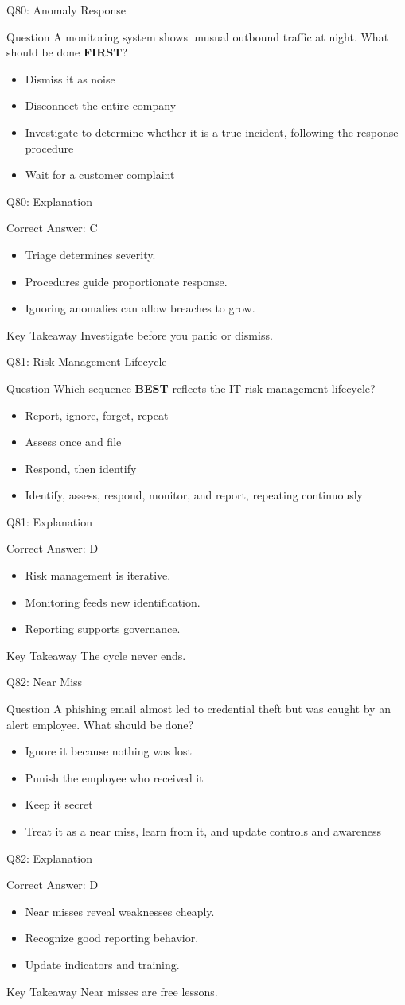\documentclass[aspectratio=169]{beamer}
\newcommand{\hq}[7]{%
	\begin{frame}{Q#1: #2}
		\begin{block}{Question}
			#3
		\end{block}
		\begin{itemize}
			#4
		\end{itemize}
	\end{frame}
	\begin{frame}{Q#1: Explanation}
		\begin{block}{Correct Answer: #5}
			\begin{itemize}
				#6
			\end{itemize}
		\end{block}
		\begin{alertblock}{Key Takeaway}
			#7
		\end{alertblock}
	\end{frame}
}
\begin{document}
	\hq{80}{Anomaly Response}
	{A monitoring system shows unusual outbound traffic at night. What should be done \textbf{FIRST}?}
	{\item[\textbf{(A)}] Dismiss it as noise
		\item[\textbf{(B)}] Disconnect the entire company
		\item[\textbf{(C)}] Investigate to determine whether it is a true incident, following the response procedure
		\item[\textbf{(D)}] Wait for a customer complaint}
	{C}
	{\item Triage determines severity.
		\item Procedures guide proportionate response.
		\item Ignoring anomalies can allow breaches to grow.}
	{Investigate before you panic or dismiss.}
	
	\hq{81}{Risk Management Lifecycle}
	{Which sequence \textbf{BEST} reflects the IT risk management lifecycle?}
	{\item[\textbf{(A)}] Report, ignore, forget, repeat
		\item[\textbf{(B)}] Assess once and file
		\item[\textbf{(C)}] Respond, then identify
		\item[\textbf{(D)}] Identify, assess, respond, monitor, and report, repeating continuously}
	{D}
	{\item Risk management is iterative.
		\item Monitoring feeds new identification.
		\item Reporting supports governance.}
	{The cycle never ends.}
	
	\hq{82}{Near Miss}
	{A phishing email almost led to credential theft but was caught by an alert employee. What should be done?}
	{\item[\textbf{(A)}] Ignore it because nothing was lost
		\item[\textbf{(B)}] Punish the employee who received it
		\item[\textbf{(C)}] Keep it secret
		\item[\textbf{(D)}] Treat it as a near miss, learn from it, and update controls and awareness}
	{D}
	{\item Near misses reveal weaknesses cheaply.
		\item Recognize good reporting behavior.
		\item Update indicators and training.}
	{Near misses are free lessons.}
	
\end{document}
